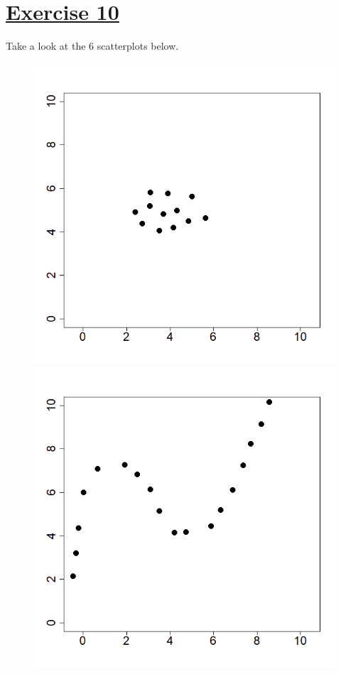\documentclass[captions=tableheading, 12pt, headings=small, parskip=half]{scrartcl}
\begin{document}
\section*{\underline{Exercise 10}}
Take a look at the 6 scatterplots below.
\begin{figure}[H]
	\begin{minipage}{0.32 \columnwidth}
		\includegraphics[width = \columnwidth]{Code1/plot1.png}
		\includegraphics[width = \columnwidth]{Code1/plot4.png}

\end{minipage}
\end{figure}
\end{document}
